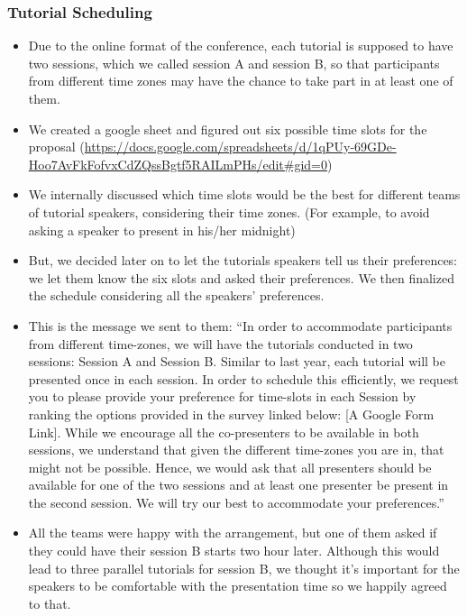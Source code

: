 \documentclass[%
10pt,								%
]
{scrartcl}
\begin{document}
\begin{itemize}
            \end{itemize}

        \subsubsection{Tutorial Scheduling}
            \begin{itemize}
                \item   Due to the online format of the conference, each tutorial is supposed to have two sessions, which we called session A and session B, so that participants from different time zones may have the chance to take part in at least one of them.

                \item   We created a google sheet and figured out six possible time slots for the proposal (\href{https://docs.google.com/spreadsheets/d/1qPUy-69GDe-Hoo7AvFkFofvxCdZQssBgtf5RAILmPHs/edit#gid=0}{https://docs.google.com/spreadsheets/d/1qPUy-69GDe-Hoo7AvFkFofvxCdZQssBgtf5RAILmPHs/edit\#gid=0}) 

                \item We internally discussed which time slots would be the best for different teams of tutorial speakers, considering their time zones.  (For example, to avoid asking a speaker to present in his/her midnight)

                \item   But, we decided later on to let the tutorials speakers tell us their preferences: we let them know the six slots and asked their preferences.  We then finalized the schedule considering all the speakers’ preferences.

                \item This is the message we sent to them: ``In order to accommodate participants from different time-zones, we will have the tutorials conducted in two sessions: Session A  and Session B. Similar to last year, each tutorial will be presented once in each session. In order to schedule this efficiently, we request you to please  provide your preference for time-slots in each Session by ranking the options provided in the survey linked below: [A Google Form Link].   While we encourage all the co-presenters to be available in both sessions, we understand that given the different time-zones you are in, that might not be possible. Hence, we would ask that all presenters should be available for one of the two sessions and at least one presenter be present in the second session. We will try our best to accommodate your preferences.''
                \item   All the teams were happy with the arrangement, but one of them asked if they could have their session B starts two hour later.  Although this would lead to three parallel tutorials for session B, we thought it’s important for the speakers to be comfortable with the presentation time so we happily agreed to that.

            \end{itemize}
  
\end{document}

